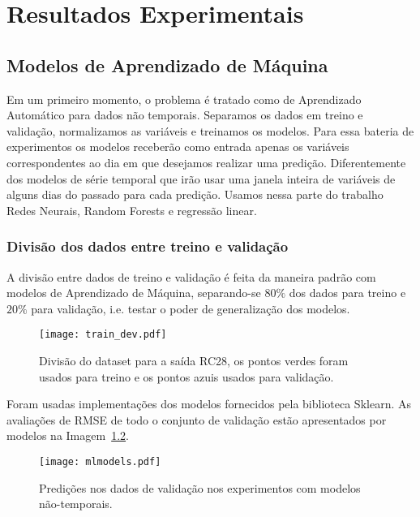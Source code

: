 \chapter{ Resultados Experimentais }
\label{cap:resultados}



\section{Modelos de Aprendizado de Máquina}


Em um primeiro momento, o problema é tratado como de Aprendizado Automático para
dados não temporais. Separamos os dados em treino e validação, normalizamos as variáveis e
treinamos os modelos. Para essa bateria de experimentos os modelos receberão
como entrada apenas os variáveis correspondentes ao dia em que desejamos
realizar uma predição. Diferentemente dos modelos de série temporal que irão
usar uma janela inteira de variáveis de alguns dias do passado para cada
predição. Usamos nessa parte do trabalho Redes Neurais, Random Forests e regressão linear.

\subsection{Divisão dos dados entre treino e validação}


A divisão entre dados de treino e validação é feita da maneira padrão com
modelos de Aprendizado de Máquina, separando-se $80\%$ dos dados para treino e
$20\%$ para validação, i.e. testar o poder de generalização dos modelos. 

\begin{figure}[H]
  \centering
  \texttt{[image: train\_dev.pdf]}
  \caption{Divisão do dataset para a saída RC28, os pontos verdes foram usados para
    treino e os pontos azuis usados para validação.}
  \label{fig:divrc28}
\end{figure}

Foram usadas implementações dos modelos fornecidos pela biblioteca Sklearn.
As avaliações de RMSE de todo o conjunto de validação estão apresentados por modelos na Imagem~\ref{fig:mlmodels}.  

\begin{figure}[H]
  \centering
\texttt{[image: mlmodels.pdf]}
\caption{Predições nos dados de validação nos experimentos com modelos não-temporais. }
\label{fig:mlmodels}
\end{figure}


